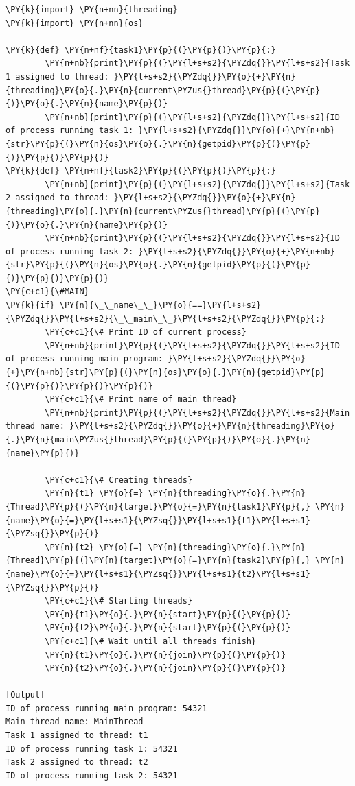 \begin{Verbatim}[label=\makebox{\url{https://github.com/lucabaldini/cmepda/tree/master/slides/latex/snippets/threading_basic.py}},commandchars=\\\{\}]
\PY{k}{import} \PY{n+nn}{threading}
\PY{k}{import} \PY{n+nn}{os}

\PY{k}{def} \PY{n+nf}{task1}\PY{p}{(}\PY{p}{)}\PY{p}{:}
        \PY{n+nb}{print}\PY{p}{(}\PY{l+s+s2}{\PYZdq{}}\PY{l+s+s2}{Task 1 assigned to thread: }\PY{l+s+s2}{\PYZdq{}}\PY{o}{+}\PY{n}{threading}\PY{o}{.}\PY{n}{current\PYZus{}thread}\PY{p}{(}\PY{p}{)}\PY{o}{.}\PY{n}{name}\PY{p}{)}
        \PY{n+nb}{print}\PY{p}{(}\PY{l+s+s2}{\PYZdq{}}\PY{l+s+s2}{ID of process running task 1: }\PY{l+s+s2}{\PYZdq{}}\PY{o}{+}\PY{n+nb}{str}\PY{p}{(}\PY{n}{os}\PY{o}{.}\PY{n}{getpid}\PY{p}{(}\PY{p}{)}\PY{p}{)}\PY{p}{)}
\PY{k}{def} \PY{n+nf}{task2}\PY{p}{(}\PY{p}{)}\PY{p}{:}
        \PY{n+nb}{print}\PY{p}{(}\PY{l+s+s2}{\PYZdq{}}\PY{l+s+s2}{Task 2 assigned to thread: }\PY{l+s+s2}{\PYZdq{}}\PY{o}{+}\PY{n}{threading}\PY{o}{.}\PY{n}{current\PYZus{}thread}\PY{p}{(}\PY{p}{)}\PY{o}{.}\PY{n}{name}\PY{p}{)}
        \PY{n+nb}{print}\PY{p}{(}\PY{l+s+s2}{\PYZdq{}}\PY{l+s+s2}{ID of process running task 2: }\PY{l+s+s2}{\PYZdq{}}\PY{o}{+}\PY{n+nb}{str}\PY{p}{(}\PY{n}{os}\PY{o}{.}\PY{n}{getpid}\PY{p}{(}\PY{p}{)}\PY{p}{)}\PY{p}{)}
\PY{c+c1}{\#MAIN}
\PY{k}{if} \PY{n}{\_\_name\_\_}\PY{o}{==}\PY{l+s+s2}{\PYZdq{}}\PY{l+s+s2}{\_\_main\_\_}\PY{l+s+s2}{\PYZdq{}}\PY{p}{:}
        \PY{c+c1}{\# Print ID of current process}
        \PY{n+nb}{print}\PY{p}{(}\PY{l+s+s2}{\PYZdq{}}\PY{l+s+s2}{ID of process running main program: }\PY{l+s+s2}{\PYZdq{}}\PY{o}{+}\PY{n+nb}{str}\PY{p}{(}\PY{n}{os}\PY{o}{.}\PY{n}{getpid}\PY{p}{(}\PY{p}{)}\PY{p}{)}\PY{p}{)}
        \PY{c+c1}{\# Print name of main thread}
        \PY{n+nb}{print}\PY{p}{(}\PY{l+s+s2}{\PYZdq{}}\PY{l+s+s2}{Main thread name: }\PY{l+s+s2}{\PYZdq{}}\PY{o}{+}\PY{n}{threading}\PY{o}{.}\PY{n}{main\PYZus{}thread}\PY{p}{(}\PY{p}{)}\PY{o}{.}\PY{n}{name}\PY{p}{)}

        \PY{c+c1}{\# Creating threads}
        \PY{n}{t1} \PY{o}{=} \PY{n}{threading}\PY{o}{.}\PY{n}{Thread}\PY{p}{(}\PY{n}{target}\PY{o}{=}\PY{n}{task1}\PY{p}{,} \PY{n}{name}\PY{o}{=}\PY{l+s+s1}{\PYZsq{}}\PY{l+s+s1}{t1}\PY{l+s+s1}{\PYZsq{}}\PY{p}{)}
        \PY{n}{t2} \PY{o}{=} \PY{n}{threading}\PY{o}{.}\PY{n}{Thread}\PY{p}{(}\PY{n}{target}\PY{o}{=}\PY{n}{task2}\PY{p}{,} \PY{n}{name}\PY{o}{=}\PY{l+s+s1}{\PYZsq{}}\PY{l+s+s1}{t2}\PY{l+s+s1}{\PYZsq{}}\PY{p}{)}
        \PY{c+c1}{\# Starting threads}
        \PY{n}{t1}\PY{o}{.}\PY{n}{start}\PY{p}{(}\PY{p}{)}
        \PY{n}{t2}\PY{o}{.}\PY{n}{start}\PY{p}{(}\PY{p}{)}
        \PY{c+c1}{\# Wait until all threads finish}
        \PY{n}{t1}\PY{o}{.}\PY{n}{join}\PY{p}{(}\PY{p}{)}
        \PY{n}{t2}\PY{o}{.}\PY{n}{join}\PY{p}{(}\PY{p}{)}

[Output]
ID of process running main program: 54321
Main thread name: MainThread
Task 1 assigned to thread: t1
ID of process running task 1: 54321
Task 2 assigned to thread: t2
ID of process running task 2: 54321
\end{Verbatim}